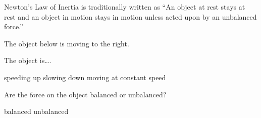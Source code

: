 \documentclass[../main-physics-problems.tex]{subfiles}
\begin{document}
\begin{questions}
\question
Newton’s Law of Inertia is traditionally written as ``An object at rest stays at rest and an object in motion stays in motion unless acted upon by an unbalanced force.'' 


\clearpage
\begin{multicols*}{2}


\question \label{T7nyj}
The object below is moving to the right.

\begin{center}
\end{center}

The object is\dots .

\begin{randomizechoices}[norandomize]
    \choice speeding up
    \choice slowing down
    \correctchoice moving at constant speed 
\end{randomizechoices}

\question \label{lUN3c}
Are the force on the object balanced or unbalanced?

\begin{randomizechoices}[norandomize]
    \correctchoice balanced
    \choice unbalanced
\end{randomizechoices}


\end{multicols*}
\end{questions}
\end{document}

